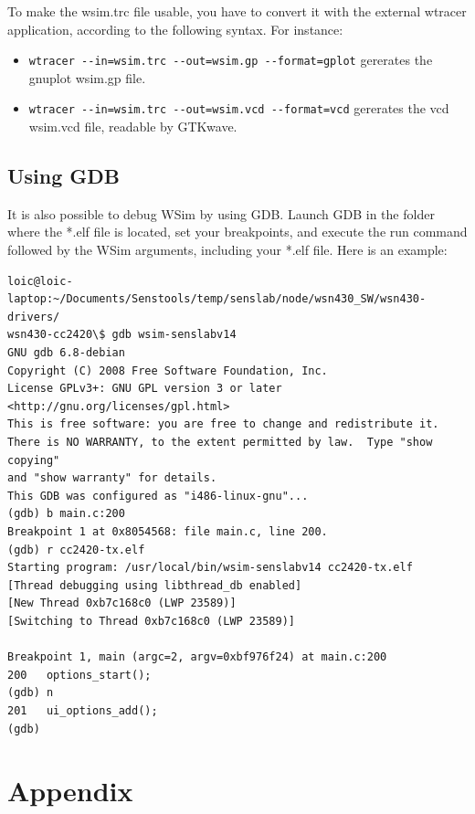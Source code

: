 \documentclass[a4paper,10pt]{report}
\begin{document}
To make the wsim.trc file usable, you have to convert it with the external wtracer application, according to the following syntax. For instance:
\begin{itemize}
  \item\verb$wtracer --in=wsim.trc --out=wsim.gp --format=gplot$ gererates the gnuplot wsim.gp file. 
  \item\verb$wtracer --in=wsim.trc --out=wsim.vcd --format=vcd$ gererates the vcd wsim.vcd file, readable by GTKwave.
\end{itemize}


\section{Using GDB}
It is also possible to debug WSim by using GDB. Launch GDB in the folder where the *.elf file is located, set your breakpoints, and execute the run command followed by the WSim arguments, including your *.elf file. Here is an example:
\begin{verbatim}
loic@loic-laptop:~/Documents/Senstools/temp/senslab/node/wsn430_SW/wsn430-drivers/
wsn430-cc2420\$ gdb wsim-senslabv14
GNU gdb 6.8-debian
Copyright (C) 2008 Free Software Foundation, Inc.
License GPLv3+: GNU GPL version 3 or later <http://gnu.org/licenses/gpl.html>
This is free software: you are free to change and redistribute it.
There is NO WARRANTY, to the extent permitted by law.  Type "show copying"
and "show warranty" for details.
This GDB was configured as "i486-linux-gnu"...
(gdb) b main.c:200
Breakpoint 1 at 0x8054568: file main.c, line 200.
(gdb) r cc2420-tx.elf 
Starting program: /usr/local/bin/wsim-senslabv14 cc2420-tx.elf
[Thread debugging using libthread_db enabled]
[New Thread 0xb7c168c0 (LWP 23589)]
[Switching to Thread 0xb7c168c0 (LWP 23589)]

Breakpoint 1, main (argc=2, argv=0xbf976f24) at main.c:200
200	  options_start();
(gdb) n
201	  ui_options_add();
(gdb) 
\end{verbatim}


\chapter{Appendix}
\end{document}
